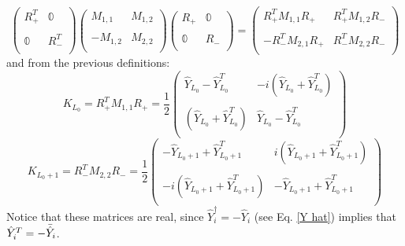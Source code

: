 \begin{equation}
    \begin{pmatrix}
        R_+^T & \mathbb{0} \\
        \\
        \mathbb{0} & R_-^T \\
    \end{pmatrix}\begin{pmatrix}
        M_{1,1} & M_{1,2} \\
        \\
        -M_{1,2} & M_{2,2} \\
    \end{pmatrix}\begin{pmatrix}
        R_+ & \mathbb{0} \\
        \\
        \mathbb{0} & R_- \\
    \end{pmatrix} = \begin{pmatrix}
        R_+^T M_{1,1} R_+ & R_+^T M_{1,2} R_- \\
        \\
        -R_-^T M_{2,1} R_+ & R_-^T M_{2,2}R_- \\
    \end{pmatrix}
\end{equation}
and from the previous definitions:
\begin{equation}
   K_{L_0} = R_+^T M_{1,1} R_+ = \frac{1}{2}\begin{pmatrix}
        \hat{Y}_{L_0} - \hat{Y}_{L_0}^T & -i (\hat{Y}_{L_0} + \hat{Y}_{L_0}^T) \\
        \\
        (\hat{Y}_{L_0} + \hat{Y}_{L_0}^T) & \hat{Y}_{L_0} - \hat{Y}_{L_0}^T \\
    \end{pmatrix}
\end{equation}
\begin{equation}
   K_{L_0 + 1} = R_-^T M_{2,2} R_- = \frac{1}{2}\begin{pmatrix}
        -\hat{Y}_{L_0 + 1} + \hat{Y}_{L_0 + 1}^T & i (\hat{Y}_{L_0 + 1} + \hat{Y}_{L_0 + 1}^T) \\
        \\
        -i(\hat{Y}_{L_0 + 1} + \hat{Y}_{L_0 + 1}^T) & - \hat{Y}_{L_0 + 1} + \hat{Y}_{L_0 + 1}^T \\
    \end{pmatrix}
\end{equation}
Notice that these matrices are real, since $\hat{Y}_i^\dagger = - \hat{Y}_i$ (see Eq. \eqref{Y hat}) implies that $\hat{Y}_i^T = - \Bar{\hat{Y}}_i$.
